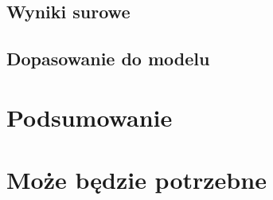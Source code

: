 \documentclass[licencjacka]{pracamgr}
\begin{document}
\section{Wyniki surowe}
\section{Dopasowanie do modelu}




\chapter{Podsumowanie}


\appendix

\chapter{Może będzie potrzebne}



\end{document}

